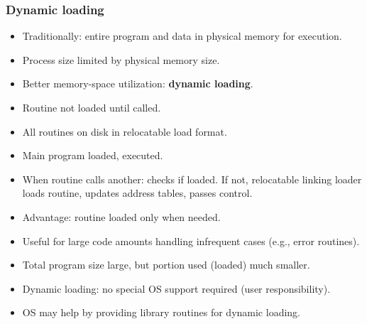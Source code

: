 \subsubsection*{Dynamic loading}
\begin{itemize}
    \item Traditionally: entire program and data in physical memory for execution.
    \item Process size limited by physical memory size.
    \item Better memory-space utilization: \textbf{dynamic loading}.
    \item Routine not loaded until called.
    \item All routines on disk in relocatable load format.
    \item Main program loaded, executed.
    \item When routine calls another: checks if loaded. If not, relocatable linking loader loads routine, updates address tables, passes control.
    \item Advantage: routine loaded only when needed.
    \item Useful for large code amounts handling infrequent cases (e.g., error routines).
    \item Total program size large, but portion used (loaded) much smaller.
    \item Dynamic loading: no special OS support required (user responsibility).
    \item OS may help by providing library routines for dynamic loading.
\end{itemize}

